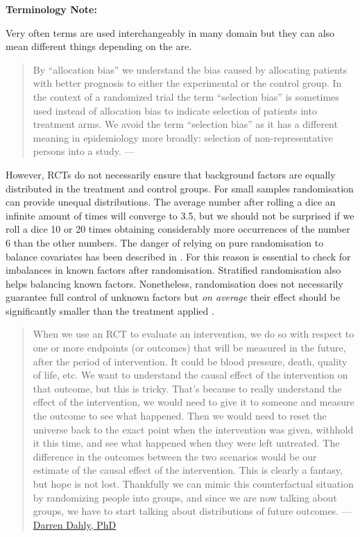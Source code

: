 \documentclass[
]{book}
\begin{document}
\begin{tipbox}

\textbf{Terminology Note:}

Very often terms are used interchangeably in many domain but they can also mean different things depending on the are.

\begin{quote}
By ``allocation bias'' we understand the bias caused by allocating patients with better prognosis to either the experimental or the control group. In the context of a randomized trial the term ``selection bias'' is sometimes used instead of allocation bias to indicate selection of patients into treatment arms. We avoid the term ``selection bias'' as it has a different meaning in epidemiology more broadly: selection of non-representative persons into a study. --- \citep{paludan2016mechanisms}
\end{quote}

\end{tipbox}

However, RCTs do not necessarily ensure that background factors are equally distributed in the treatment and control groups. For small samples randomisation can provide unequal distributions. The average number after rolling a dice an infinite amount of times will converge to 3.5, but we should not be surprised if we roll a dice 10 or 20 times obtaining considerably more occurrences of the number 6 than the other numbers. The danger of relying on pure randomisation to balance covariates has been described in \citep{krause2003random} \citep{morgan2012rerandomization}. For this reason is essential to check for imbalances in known factors after randomisation. Stratified randomisation also helps balancing known factors. Nonetheless, randomisation does not necessarily guarantee full control of unknown factors but \emph{on average} their effect should be significantly smaller than the treatment applied \citep{deaton2018understanding}.

\begin{quote}
When we use an RCT to evaluate an intervention, we do so with respect to one or more endpoints (or outcomes) that will be measured in the future, after the period of intervention. It could be blood pressure, death, quality of life, etc. We want to understand the causal effect of the intervention on that outcome, but this is tricky. That's because to really understand the effect of the intervention, we would need to give it to someone and measure the outcome to see what happened. Then we would need to reset the universe back to the exact point when the intervention was given, withhold it this time, and see what happened when they were left untreated. The difference in the outcomes between the two scenarios would be our estimate of the causal effect of the intervention. This is clearly a fantasy, but hope is not lost. Thankfully we can mimic this counterfactual situation by randomizing people into groups, and since we are now talking about groups, we have to start talking about distributions of future outcomes. --- \href{https://statsepi.substack.com/p/out-of-balance}{Darren Dahly, PhD}
\end{quote}
\end{document}
